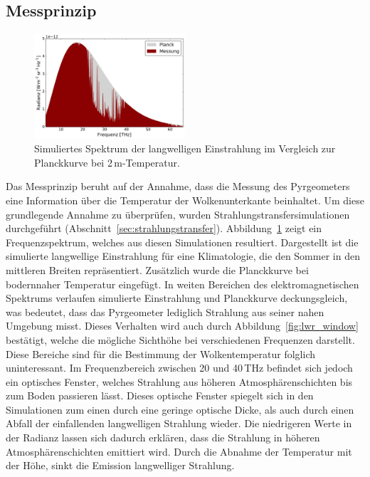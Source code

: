 \documentclass[10pt,a4paper,compsoc,peer review papers]{IEEEtran}
\begin{document}
\subsection{Messprinzip}\label{subsec:clb_prinzip}

\begin{figure}[ht]
  \centering
  \includegraphics[width=0.5\textwidth]{figures/midlatitude-summer_spectrum.pdf}
  \caption{Simuliertes Spektrum der langwelligen Einstrahlung im Vergleich zur
  Planckkurve bei 2\,m-Temperatur.}
  \label{fig:lwr_spectrum}
\end{figure}

Das Messprinzip beruht auf der Annahme, dass die Messung des Pyrgeometers eine
Information über die Temperatur der Wolkenunterkante beinhaltet. Um diese
grundlegende Annahme zu überprüfen, wurden Strahlungstransfersimulationen
durchgeführt (Abschnitt~\ref{sec:strahlungstransfer}).
Abbildung~\ref{fig:lwr_spectrum} zeigt ein Frequenzspektrum, welches aus diesen
Simulationen resultiert. Dargestellt ist die simulierte langwellige
Einstrahlung für eine Klimatologie, die den Sommer in den mittleren Breiten
repräsentiert.  Zusätzlich wurde die Planckkurve bei bodernnaher Temperatur
eingefügt. In weiten Bereichen des elektromagnetischen Spektrums verlaufen
simulierte Einstrahlung und Planckkurve deckungsgleich, was bedeutet, dass das
Pyrgeometer lediglich Strahlung aus seiner nahen Umgebung misst. Dieses Verhalten
wird auch durch Abbildung~\ref{fig:lwr_window} bestätigt, welche die mögliche
Sichthöhe bei verschiedenen Frequenzen darstellt. Diese Bereiche sind für die
Bestimmung der Wolkentemperatur folglich uninteressant. Im Frequenzbereich
zwischen 20 und 40\,THz befindet sich jedoch ein optisches Fenster, welches
Strahlung aus höheren Atmosphärenschichten bis zum Boden passieren lässt.
Dieses optische Fenster spiegelt sich in den Simulationen zum einen durch eine
geringe optische Dicke, als auch durch einen Abfall der einfallenden langwelligen
Strahlung wieder. Die niedrigeren Werte in der Radianz lassen sich dadurch
erklären, dass die Strahlung in höheren Atmosphärenschichten emittiert wird.
Durch die Abnahme der Temperatur mit der Höhe, sinkt die Emission langwelliger
Strahlung.
\end{document}
